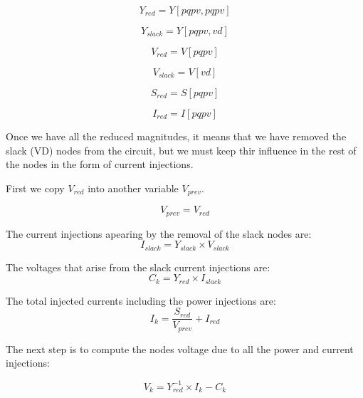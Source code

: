 \documentclass{tufte-book}
\begin{document}
\begin{equation}
Y_{red} = Y[pqpv, pqpv]
\end{equation}

\begin{equation}
Y_{slack} = Y[pqpv, vd]
\end{equation}

\begin{equation}
V_{red} = V[pqpv]
\end{equation}

\begin{equation}
V_{slack} = V[vd]
\end{equation}

\begin{equation}
S_{red} = S[pqpv]
\end{equation}

\begin{equation}
I_{red} = I[pqpv]
\end{equation}


Once we have all the reduced magnitudes, it means that we have removed the slack (VD) nodes from the circuit, but we must keep thir influence in the rest of the nodes in the form of current injections.

First we copy $V_{red}$ into another variable $V_{prev}$.

\begin{equation}
V_{prev} = V_{red}
\end{equation}

The current injections apearing by the removal of the slack nodes are:
\begin{equation}
I_{slack} = Y_{slack} \times V_{slack}
\end{equation}

The voltages that arise from the slack current injections are:
\begin{equation}
C_k = Y_{red} \times I_{slack}
\end{equation}

The total injected currents including the power injections are:
\begin{equation}
I_k = \frac{S_{red}}{V_{prev}} + I_{red}
\label{eq:zm_ik}
\end{equation}

The next step is to compute the nodes voltage due to all the power and current injections:

\begin{equation}
V_k = Y_{red}^{-1} \times I_k - C_k
\end{equation}
\end{document}
